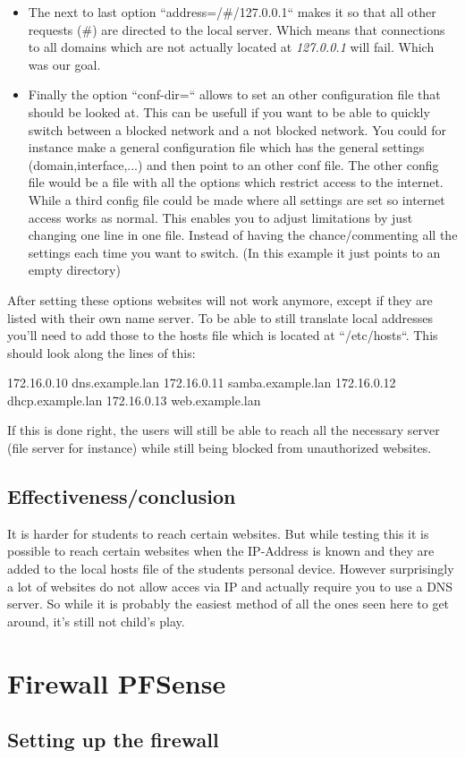 \begin{itemize}
\item The next to last option ``address=/\#/127.0.0.1`` makes it so that all other requests (\#) are directed to the local server. Which means that connections to all domains which are not actually located at \textit{127.0.0.1} will fail. Which was our goal.
\item Finally the option ``conf-dir=`` allows to set an other configuration file that should be looked at. This can be usefull if you want to be able to quickly switch between a blocked network and a not blocked network. You could for instance make a general configuration file which has the general settings (domain,interface,...) and then point to an other conf file. The other config file would be a file with all the options which restrict access to the internet. While a third config file could be made where all settings are set so internet access works as normal. This enables you to adjust limitations by just changing one line in one file. Instead of having the chance/commenting all the settings each time you want to switch. (In this example it just points to an empty directory)
\end{itemize}
After setting these options websites will not work anymore, except if they are listed with their own name server. To be able to still translate local addresses you'll need to add those to the hosts file which is located at ``/etc/hosts``. This should look along the lines of this:
\begin{cisco}[title=/etc/hosts file]
172.16.0.10 dns.example.lan
172.16.0.11 samba.example.lan
172.16.0.12 dhcp.example.lan
172.16.0.13 web.example.lan
\end{cisco}
If this is done right, the users will still be able to reach all the necessary server (file server for instance) while still being blocked from unauthorized websites.
\subsection{Effectiveness/conclusion}
It is harder for students to reach certain websites. But while testing this it is possible to reach certain websites when the IP-Address is known and they are added to the local hosts file of the students personal device. However surprisingly a lot of websites do not allow acces via IP and actually require you to use a DNS server. So while it is probably the easiest method of all the ones seen here to get around, it's still not child's play.
\section{Firewall PFSense}
\subsection{Setting up the firewall}


